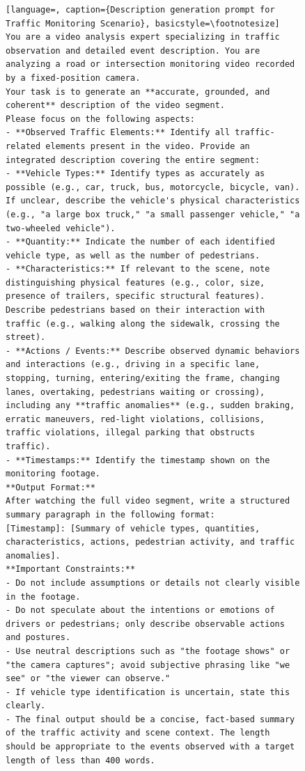 \begin{figure}[t]
\centering
\begin{minipage}{0.9\textwidth}
\begin{lstlisting}[language=, caption={Description generation prompt for Traffic Monitoring Scenario}, basicstyle=\footnotesize]
You are a video analysis expert specializing in traffic observation and detailed event description. You are analyzing a road or intersection monitoring video recorded by a fixed-position camera.
Your task is to generate an **accurate, grounded, and coherent** description of the video segment.
Please focus on the following aspects:
- **Observed Traffic Elements:** Identify all traffic-related elements present in the video. Provide an integrated description covering the entire segment:
- **Vehicle Types:** Identify types as accurately as possible (e.g., car, truck, bus, motorcycle, bicycle, van). If unclear, describe the vehicle's physical characteristics (e.g., "a large box truck," "a small passenger vehicle," "a two-wheeled vehicle").
- **Quantity:** Indicate the number of each identified vehicle type, as well as the number of pedestrians.
- **Characteristics:** If relevant to the scene, note distinguishing physical features (e.g., color, size, presence of trailers, specific structural features). Describe pedestrians based on their interaction with traffic (e.g., walking along the sidewalk, crossing the street).
- **Actions / Events:** Describe observed dynamic behaviors and interactions (e.g., driving in a specific lane, stopping, turning, entering/exiting the frame, changing lanes, overtaking, pedestrians waiting or crossing), including any **traffic anomalies** (e.g., sudden braking, erratic maneuvers, red-light violations, collisions, traffic violations, illegal parking that obstructs traffic).
- **Timestamps:** Identify the timestamp shown on the monitoring footage.
**Output Format:**
After watching the full video segment, write a structured summary paragraph in the following format:
[Timestamp]: [Summary of vehicle types, quantities, characteristics, actions, pedestrian activity, and traffic anomalies].
**Important Constraints:**
- Do not include assumptions or details not clearly visible in the footage.
- Do not speculate about the intentions or emotions of drivers or pedestrians; only describe observable actions and postures.
- Use neutral descriptions such as "the footage shows" or "the camera captures"; avoid subjective phrasing like "we see" or "the viewer can observe."
- If vehicle type identification is uncertain, state this clearly.
- The final output should be a concise, fact-based summary of the traffic activity and scene context. The length should be appropriate to the events observed with a target length of less than 400 words.
\end{lstlisting}
\end{minipage}
\end{figure}

